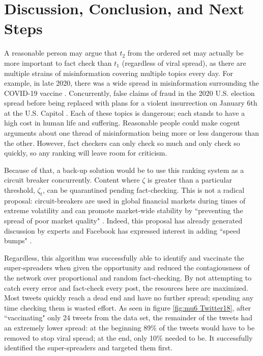 \documentclass[preprint,12pt]{elsarticle}
\begin{document}
\section{Discussion, Conclusion, and Next Steps}
A reasonable person may argue that $t_2$ from the ordered set may actually be more important to fact check than $t_1$ (regardless of viral spread), as there are multiple strains of misinformation covering multiple topics every day.  For example, in late 2020, there was a wide spread in misinformation surrounding the COVID-19 vaccine \cite{mills2020covid,bagherpour2020covid}. Concurrently, false claims of fraud in the 2020 U.S. election \cite{dean2020facebook} spread before being replaced with plans for a violent insurrection on January 6th at the U.S. Capitol \cite{fandos2021trump,Levenson2021capitol}. Each of these topics is dangerous; each stands to have a high cost in human life and suffering. Reasonable people could make cogent arguments about one thread of misinformation being more or less dangerous than the other. However, fact checkers can only check so much and only check so quickly, so any ranking will leave room for criticism.

Because of that, a back-up solution would be to use this ranking system as a circuit breaker concurrently. Content where $\zeta$ is greater than a particular threshold, $\zeta_t$, can be quarantined pending fact-checking. This is not a radical proposal: circuit-breakers are used in global financial markets during times of extreme volatility \cite{wang2019microstructure,schwert1990stock} and can promote market-wide stability by ``preventing the spread of poor market quality" \cite{brugler2014single,schneider2020stock}. Indeed, this proposal has already generated discussion by experts \cite{goodman2020digital,simpson2020fighting} and Facebook has expressed interest in adding ``speed bumps" \cite{bond2020circuit}.

Regardless, this algorithm was successfully able to identify and vaccinate the super-spreaders when given the opportunity and reduced the contagiousness of the network over proportional and random fact-checking. By not attempting to catch every error and fact-check every post, the resources here are maximized. Most tweets quickly reach a dead end and have no further spread; spending any time checking them is wasted effort. As seen in figure \ref{fig:mu6 Twitter18}, after ``vaccinating" only 24 tweets from the data set, the remainder of the tweets had an extremely lower spread: at the beginning 89\% of the tweets would have to be removed to stop viral spread; at the end, only 10\% needed to be. It successfully identified the super-spreaders and targeted them first.
\end{document}
